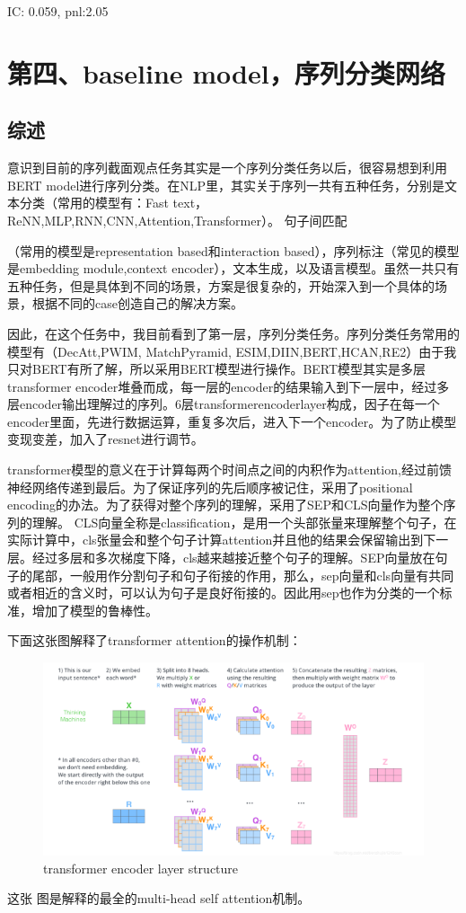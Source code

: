 \documentclass[11pt]{ctexart}
\begin{document}
{\kaishu \small IC: 0.059, pnl:2.05}


\section{第四、baseline model，序列分类网络}
\subsection{综述}
意识到目前的序列截面观点任务其实是一个序列分类任务以后，很容易想到利用BERT model进行序列分类。在NLP里，其实关于序列一共有五种任务，分别是文本分类（常用的模型有：Fast text， ReNN,MLP,RNN,CNN,Attention,Transformer）。 句子间匹配\par （常用的模型是representation based和interaction based），序列标注（常见的模型是embedding module,context encoder），文本生成，以及语言模型。虽然一共只有五种任务，但是具体到不同的场景，方案是很复杂的，开始深入到一个具体的场景，根据不同的case创造自己的解决方案。

因此，在这个任务中，我目前看到了第一层，序列分类任务。序列分类任务常用的模型有（DecAtt,PWIM,  MatchPyramid, ESIM,DIIN,BERT,HCAN,RE2）由于我只对BERT有所了解，所以采用BERT模型进行操作。BERT模型其实是多层transformer encoder堆叠而成，每一层的encoder的结果输入到下一层中，经过多层encoder输出理解过的序列。6层transformerencoderlayer构成，因子在每一个encoder里面，先进行数据运算，重复多次后，进入下一个encoder。为了防止模型变现变差，加入了resnet进行调节。

transformer模型的意义在于计算每两个时间点之间的内积作为attention,经过前馈神经网络传递到最后。为了保证序列的先后顺序被记住，采用了positional encoding的办法。为了获得对整个序列的理解，采用了SEP和CLS向量作为整个序列的理解。 CLS向量全称是classification，是用一个头部张量来理解整个句子，在实际计算中，cls张量会和整个句子计算attention并且他的结果会保留输出到下一层。经过多层和多次梯度下降，cls越来越接近整个句子的理解。SEP向量放在句子的尾部，一般用作分割句子和句子衔接的作用，那么，sep向量和cls向量有共同或者相近的含义时，可以认为句子是良好衔接的。因此用sep也作为分类的一个标准，增加了模型的鲁棒性。

下面这张图解释了transformer attention的操作机制：
\begin{figure}[H]
\begin{center}
\includegraphics[width=1.0\textwidth]{str3.PNG}
\end{center}
\caption{transformer encoder layer structure}
\label{FIG.8}
\end{figure}
这张 图是解释的最全的multi-head self attention机制。
\end{document}
